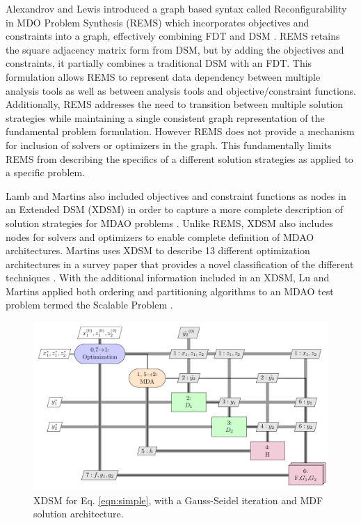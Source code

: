     Alexandrov and Lewis introduced a graph based syntax called Reconfigurability in 
    MDO Problem Synthesis (REMS) which incorporates objectives and constraints 
    into a graph, effectively combining FDT and DSM \cite{alexandrov2004}. REMS retains the square adjacency 
    matrix form from DSM, but by adding the objectives and constraints, it partially 
    combines a traditional DSM with an FDT. This formulation allows REMS to represent data 
    dependency between multiple analysis tools as well as between analysis tools and
    objective/constraint functions. Additionally, REMS addresses the need to
    transition between multiple solution strategies while maintaining a single consistent  
    graph representation of the fundamental problem formulation. However REMS does not provide 
    a mechanism for inclusion of solvers or optimizers in the graph. This fundamentally limits REMS 
    from describing the specifics of a different solution strategies as applied to a specific problem. 

    Lamb and Martins also included objectives and constraint functions as nodes 
    in an Extended DSM (XDSM) in order to capture a more complete description 
    of solution strategies for MDAO problems \cite{Lambe2012}. Unlike REMS, 
    XDSM also includes nodes for solvers and optimizers to enable complete 
    definition of MDAO architectures. Martins uses XDSM to describe 13 different 
    optimization architectures in a survey paper that provides a novel 
    classification of the different techniques \cite{Lambe2011}. With the 
    additional information included in an XDSM, Lu and Martins applied both 
    ordering and partitioning algorithms to an MDAO test problem termed the 
    Scalable Problem \cite{Lu2012}. 

    \begin{figure}
        \begin{center}
        \includegraphics[height=.25\textheight]{XDSM/simple}
        \caption{XDSM for Eq. \ref{eqn:simple}, with a Gauss-Seidel iteration 
          and MDF solution architecture. \label{fig:XDSM_simple}}
        \end{center}
    \end{figure}

